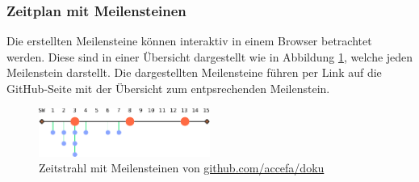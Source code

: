 \subsubsection{Zeitplan mit Meilensteinen}
Die erstellten Meilensteine können interaktiv in einem Browser betrachtet
werden. Diese sind in einer Übersicht dargestellt wie in Abbildung
\ref{fig:milestones}, welche jeden Meilenstein darstellt. Die dargestellten
Meilensteine führen per Link auf die GitHub-Seite mit der Übersicht zum
entpsrechenden Meilenstein.

\begin{figure}[h!]
	\centering
	\includegraphics[width=0.5\textwidth]{../../fig/github/milestones.pdf}
	\caption{Zeitstrahl mit Meilensteinen von \url{github.com/accefa/doku}}
	\label{fig:milestones}
\end{figure}
